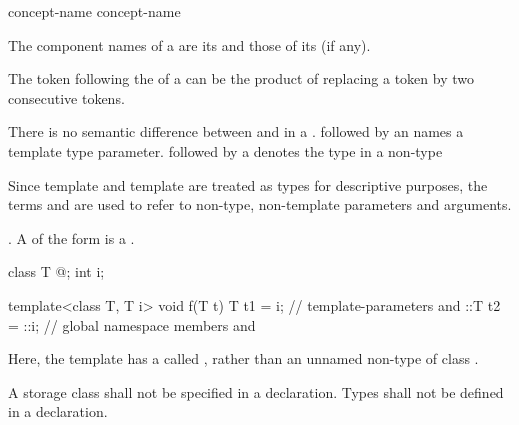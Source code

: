 \begin{bnf}
\br
  \br
\end{bnf}

\begin{bnf}
\br
   concept-name\br
   concept-name \terminal{<}  \terminal{>}
\end{bnf}

%
The component names of a  are
its  and
those of its  (if any).
\begin{note}
The \tcode{>} token following the
 of a
can be the product of replacing a
\tcode{>>} token by two consecutive \tcode{>}
tokens.
\end{note}

\pnum
There is no semantic difference between
and
in a
.
followed by an
names a template type parameter.
followed by a
denotes the type in a non-type
\begin{footnote}
Since template
and template
are treated as types for descriptive purposes, the terms
and
are used to refer to non-type, non-template parameters and arguments.
\end{footnote}
.
A  of the form
  is a .
\begin{example}
\begin{codeblock}
class T { @\commentellip@ };
int i;

template<class T, T i> void f(T t) {
  T t1 = i;         // template-parameters  and 
  ::T t2 = ::i;     // global namespace members  and 
}
\end{codeblock}
Here, the template  has a 
called , rather than an unnamed non-type
 of class .
\end{example}
A storage class shall not be specified in a
declaration.
Types shall not be defined in a 
declaration.

